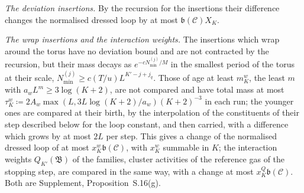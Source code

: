 \documentclass[11pt]{preprint}
\numberwithin{equation}{section}
\theoremstyle{definition}
\theoremstyle{remark}
\theoremstyle{plain}
\begin{document}
\emph{The deviation insertions.} By the recursion for the insertions their difference changes the normalised dressed loop by at most $\mathfrak b(\mathcal C)X_K$.

\emph{The wrap insertions and the interaction weights.} The insertions which wrap around the torus have no deviation bound and are not contracted by the recursion, but their mass decays as $e^{-cN^{(j)}_{\min}/M}$ in the smallest period of the torus at their scale, $N^{(j)}_{\min} \geq c(T/u)L^{K'-j+j_q}$. Those of age at least $m^w_K$, the least $m$ with $a_wL^m \geq 3\log(K + 2)$, are not compared and have total mass at most $\tau^w_K \coloneqq 2A_w\max(L, 3L\log(K + 2)/a_w)(K + 2)^{-3}$ in each run; the younger ones are compared at their birth, by the interpolation of the constituents of their step described below for the loop constant, and then carried, with a difference which grows by at most $2L$ per step. This gives a change of the normalised dressed loop of at most $x^w_K\mathfrak b(\mathcal C)$, with $x^w_K$ summable in $K$; the interaction weights $Q_{K'}(\mathfrak B)$ of the families, cluster activities of the reference gas of the stopping step, are compared in the same way, with a change at most $x^Q_K\mathfrak b(\mathcal C)$. Both are Supplement, Proposition~S.16(g).
\end{document}

